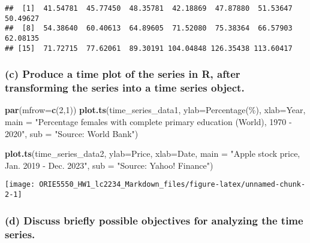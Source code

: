 \documentclass[
]{article}
\newenvironment{Shaded}{\begin{snugshade}}{\end{snugshade}}
\newcommand{\AttributeTok}[1]{\textcolor[rgb]{0.13,0.29,0.53}{#1}}
\newcommand{\DecValTok}[1]{\textcolor[rgb]{0.00,0.00,0.81}{#1}}
\newcommand{\FunctionTok}[1]{\textcolor[rgb]{0.13,0.29,0.53}{\textbf{#1}}}
\newcommand{\NormalTok}[1]{#1}
\newcommand{\StringTok}[1]{\textcolor[rgb]{0.31,0.60,0.02}{#1}}
\begin{document}
\begin{verbatim}
##  [1]  41.54781  45.77450  48.35781  42.18869  47.87880  51.53647  50.49627
##  [8]  54.38640  60.40613  64.89605  71.52080  75.38364  66.57903  62.08135
## [15]  71.72715  77.62061  89.30191 104.04848 126.35438 113.60417
\end{verbatim}

\hypertarget{c-produce-a-time-plot-of-the-series-in-r-after-transforming-the-series-into-a-time-series-object.}{%
\subsubsection{(c) Produce a time plot of the series in R, after
transforming the series into a time series
object.}\label{c-produce-a-time-plot-of-the-series-in-r-after-transforming-the-series-into-a-time-series-object.}}

\begin{Shaded}
\begin{Highlighting}[]
\FunctionTok{par}\NormalTok{(}\AttributeTok{mfrow=}\FunctionTok{c}\NormalTok{(}\DecValTok{2}\NormalTok{,}\DecValTok{1}\NormalTok{))}
\FunctionTok{plot.ts}\NormalTok{(time\_series\_data1, }\AttributeTok{ylab=}\StringTok{\textquotesingle{}Percentage(\%)\textquotesingle{}}\NormalTok{, }\AttributeTok{xlab=}\StringTok{\textquotesingle{}Year\textquotesingle{}}\NormalTok{, }
        \AttributeTok{main =} \StringTok{"Percentage females with complete primary education (World), 1970 {-} 2020"}\NormalTok{,}
        \AttributeTok{sub =} \StringTok{"Source: World Bank"}\NormalTok{)}


\FunctionTok{plot.ts}\NormalTok{(time\_series\_data2, }\AttributeTok{ylab=}\StringTok{\textquotesingle{}Price\textquotesingle{}}\NormalTok{, }\AttributeTok{xlab=}\StringTok{\textquotesingle{}Date\textquotesingle{}}\NormalTok{,}
        \AttributeTok{main =} \StringTok{"Apple stock price, Jan. 2019 {-} Dec. 2023"}\NormalTok{, }
        \AttributeTok{sub =} \StringTok{"Source: Yahoo! Finance"}\NormalTok{)}
\end{Highlighting}
\end{Shaded}

\begin{center}\texttt{[image: ORIE5550\_HW1\_lc2234\_Markdown\_files/figure-latex/unnamed-chunk-2-1]} \end{center}

\hypertarget{d-discuss-briefly-possible-objectives-for-analyzing-the-time-series.}{%
\subsubsection{(d) Discuss briefly possible objectives for analyzing the
time
series.}\label{d-discuss-briefly-possible-objectives-for-analyzing-the-time-series.}}
\end{document}
